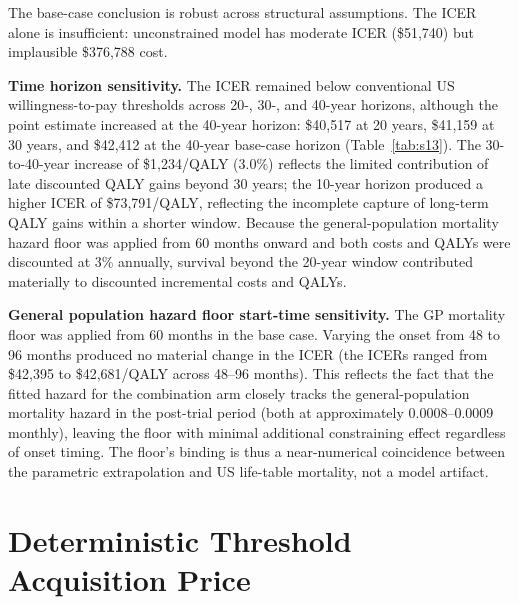 \documentclass[11pt,a4paper]{article}
\begin{document}
\noindent The base-case conclusion is robust across structural assumptions. The ICER alone is insufficient: unconstrained model has moderate ICER (\$51,740) but implausible \$376,788 cost.

\indent \textbf{Time horizon sensitivity.} The ICER remained below conventional US willingness-to-pay thresholds across 20-, 30-, and 40-year horizons, although the point estimate increased at the 40-year horizon: \$40,517 at 20 years, \$41,159 at 30 years, and \$42,412 at the 40-year base-case horizon (Table~\ref{tab:s13}). The 30-to-40-year increase of \$1,234/QALY (3.0\%) reflects the limited contribution of late discounted QALY gains beyond 30 years; the 10-year horizon produced a higher ICER of \$73,791/QALY, reflecting the incomplete capture of long-term QALY gains within a shorter window. Because the general-population mortality hazard floor was applied from 60 months onward and both costs and QALYs were discounted at 3\% annually, survival beyond the 20-year window contributed materially to discounted incremental costs and QALYs.

\noindent \textbf{General population hazard floor start-time sensitivity.} The GP mortality floor was applied from 60 months in the base case. Varying the onset from 48 to 96 months produced no material change in the ICER (the ICERs ranged from \$42,395 to \$42,681/QALY across 48--96 months). This reflects the fact that the fitted hazard for the combination arm closely tracks the general-population mortality hazard in the post-trial period (both at approximately 0.0008--0.0009 monthly), leaving the floor with minimal additional constraining effect regardless of onset timing. The floor's binding is thus a near-numerical coincidence between the parametric extrapolation and US life-table mortality, not a model artifact.

\section{Deterministic Threshold Acquisition Price}
\end{document}
